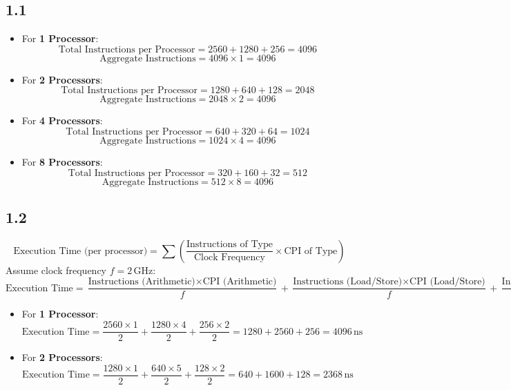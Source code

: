 \documentclass[cn,12pt]{homework}
\begin{document}
\begin{solution}
  \quad
\subsection*{1.1}
\begin{itemize}
    \item For \textbf{1 Processor}:
    \[
    \text{Total Instructions per Processor} = 2560 + 1280 + 256 = 4096
    \]
    \[
    \text{Aggregate Instructions} = 4096 \times 1 = 4096
    \]

    \item For \textbf{2 Processors}:
    \[
    \text{Total Instructions per Processor} = 1280 + 640 + 128 = 2048
    \]
    \[
    \text{Aggregate Instructions} = 2048 \times 2 = 4096
    \]

    \item For \textbf{4 Processors}:
    \[
    \text{Total Instructions per Processor} = 640 + 320 + 64 = 1024
    \]
    \[
    \text{Aggregate Instructions} = 1024 \times 4 = 4096
    \]

    \item For \textbf{8 Processors}:
    \[
    \text{Total Instructions per Processor} = 320 + 160 + 32 = 512
    \]
    \[
    \text{Aggregate Instructions} = 512 \times 8 = 4096
    \]
\end{itemize}

\subsection*{1.2}
\[
\text{Execution Time (per processor)} = \sum \left( \frac{\text{Instructions of Type}}{\text{Clock Frequency}} \times \text{CPI of Type} \right)
\]
Assume clock frequency \(f = 2 \, \text{GHz}\):
\[
\text{Execution Time} = \frac{\text{Instructions (Arithmetic)} \times \text{CPI (Arithmetic)}}{f} + \frac{\text{Instructions (Load/Store)} \times \text{CPI (Load/Store)}}{f} + \frac{\text{Instructions (Branch)} \times \text{CPI (Branch)}}{f}
\]

\begin{itemize}
    \item For \textbf{1 Processor}:
    \[
    \text{Execution Time} = \frac{2560 \times 1}{2} + \frac{1280 \times 4}{2} + \frac{256 \times 2}{2} = 1280 + 2560 + 256 = 4096 \, \text{ns}
    \]

    \item For \textbf{2 Processors}:
    \[
    \text{Execution Time} = \frac{1280 \times 1}{2} + \frac{640 \times 5}{2} + \frac{128 \times 2}{2} = 640 + 1600 + 128 = 2368 \, \text{ns}
    \]


\end{itemize}
\end{solution}
\end{document}
